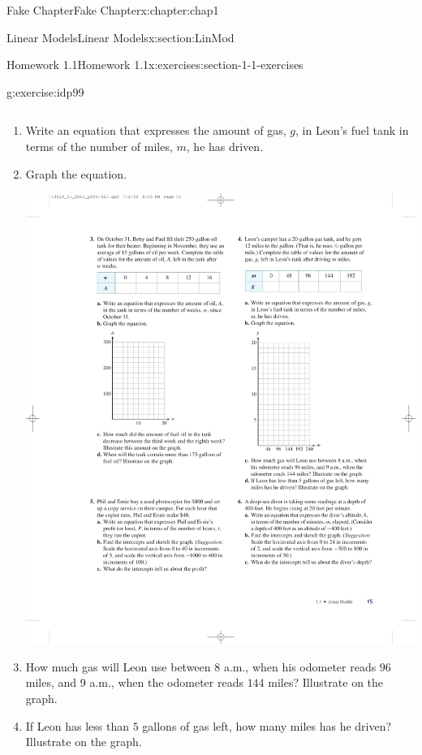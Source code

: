 \documentclass[oneside,10pt,]{book}
\numberwithin{equation}{section}
\begin{document}
\begin{chapterptx}{Fake Chapter}{}{Fake Chapter}{}{}{x:chapter:chap1}
\begin{sectionptx}{Linear Models}{}{Linear Models}{}{}{x:section:LinMod}
\begin{exercises-subsection}{Homework 1.1}{}{Homework 1.1}{}{}{x:exercises:section-1-1-exercises}
\begin{divisionexercise}{4}{}{}{g:exercise:idp99}
\begin{center}
{\begin{tabular}{AcAcAcAcAcAcA}
\end{tabular}
}%
\end{center}%
%
\begin{enumerate}[label=\alph*]
\item{}Write an equation that expresses the amount of gas, \(g\), in Leon's fuel tank in terms of the number of miles, \(m\), he has driven.%
\item{}Graph the equation.%
\begin{sidebyside}{1}{0.3}{0.3}{0}%
\begin{sbspanel}{0.4}%
\includegraphics[width=\linewidth]{external/photos/fig-ex-1-1-4.pdf}
\end{sbspanel}%
\end{sidebyside}%
\item{}How much gas will Leon use between 8 a.m., when his odometer reads \(96\) miles, and 9 a.m., when the odometer reads \(144\) miles? Illustrate on the graph.%
\item{}If Leon has less than \(5\) gallons of gas left, how many miles has he driven? Illustrate on the graph.%
\end{enumerate}
%
\end{divisionexercise}%

\end{exercises-subsection}
\end{sectionptx}
\end{chapterptx}
\end{document}
